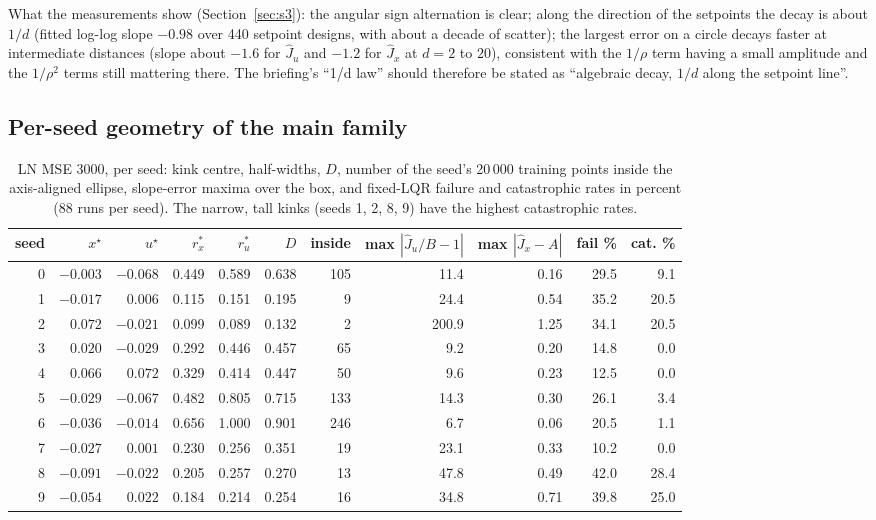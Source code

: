 \documentclass[11pt]{article}
\begin{document}
What the measurements show (Section~\ref{sec:s3}): the angular sign alternation is clear; along the direction of the setpoints the decay is about $1/d$ (fitted log-log slope $-0.98$ over 440 setpoint designs, with about a decade of scatter); the largest error on a circle decays faster at intermediate distances (slope about $-1.6$ for $\hat J_u$ and $-1.2$ for $\hat J_x$ at $d=2$ to $20$), consistent with the $1/\rho$ term having a small amplitude and the $1/\rho^2$ terms still mattering there. The briefing's ``1/d law'' should therefore be stated as ``algebraic decay, $1/d$ along the setpoint line''.

\subsection{Per-seed geometry of the main family}
\begin{table}[H]
\centering
\footnotesize
\setlength{\tabcolsep}{3pt}
\begin{tabular}{rrrrrrrrrrr}
\toprule
seed & $x^\star$ & $u^\star$ & $r^*_x$ & $r^*_u$ & $D$ & inside & max $|\hat J_u/B-1|$ & max $|\hat J_x-A|$ & fail \% & cat. \% \\
\midrule
0 & $-0.003$ & $-0.068$ & 0.449 & 0.589 & 0.638 & 105 & 11.4 & 0.16 & 29.5 & 9.1 \\
1 & $-0.017$ & $0.006$ & 0.115 & 0.151 & 0.195 & 9 & 24.4 & 0.54 & 35.2 & 20.5 \\
2 & $0.072$ & $-0.021$ & 0.099 & 0.089 & 0.132 & 2 & 200.9 & 1.25 & 34.1 & 20.5 \\
3 & $0.020$ & $-0.029$ & 0.292 & 0.446 & 0.457 & 65 & 9.2 & 0.20 & 14.8 & 0.0 \\
4 & $0.066$ & $0.072$ & 0.329 & 0.414 & 0.447 & 50 & 9.6 & 0.23 & 12.5 & 0.0 \\
5 & $-0.029$ & $-0.067$ & 0.482 & 0.805 & 0.715 & 133 & 14.3 & 0.30 & 26.1 & 3.4 \\
6 & $-0.036$ & $-0.014$ & 0.656 & 1.000 & 0.901 & 246 & 6.7 & 0.06 & 20.5 & 1.1 \\
7 & $-0.027$ & $0.001$ & 0.230 & 0.256 & 0.351 & 19 & 23.1 & 0.33 & 10.2 & 0.0 \\
8 & $-0.091$ & $-0.022$ & 0.205 & 0.257 & 0.270 & 13 & 47.8 & 0.49 & 42.0 & 28.4 \\
9 & $-0.054$ & $0.022$ & 0.184 & 0.214 & 0.254 & 16 & 34.8 & 0.71 & 39.8 & 25.0 \\
\bottomrule
\end{tabular}
\caption{LN MSE 3000, per seed: kink centre, half-widths, $D$, number of the seed's 20\,000 training points inside the axis-aligned ellipse, slope-error maxima over the box, and fixed-LQR failure and catastrophic rates in percent (88 runs per seed). The narrow, tall kinks (seeds 1, 2, 8, 9) have the highest catastrophic rates.}
\label{tab:seeds}
\end{table}
\end{document}
